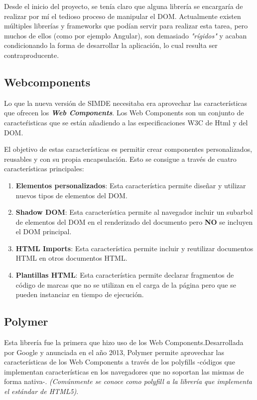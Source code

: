 Desde el inicio del proyecto, se tenía claro que alguna librería se encargaría de realizar 
por mí el tedioso proceso de manipular el DOM. Actualmente existen múltiples librerías 
y frameworks que podían servir para realizar esta tarea, pero muchos de ellos (como por ejemplo Angular),
son demasiado \textit{"rígidos"} y acaban condicionando la forma de desarrollar la aplicación, 
lo cual resulta ser contraproducente.

\subsection{Webcomponents}

\bigskip
Lo que la nueva versión de SIMDE necesitaba era aprovechar las características que ofrecen los
\textit\textbf{Web Components}. Los Web Components son un conjunto de caracteŕisticas que se 
están añadiendo a las especificaciones W3C de Html y del DOM.

\bigskip 
El objetivo de estas características es permitir crear componentes personalizados, reusables y 
con su propia encapsulación. Esto se consigue a través de cuatro características principales:

\begin{enumerate}

\item \textbf{Elementos personalizados}: Esta característica permite diseñar y utilizar nuevos tipos 
de elementos del DOM.
\item \textbf{Shadow DOM}: Esta característica permite al navegador incluir un subarbol de elementos del 
DOM en el renderizado del documento pero \textbf{NO} se incluyen el DOM principal.
\item \textbf{HTML Imports}: Esta característica permite incluir y reutilizar documentos HTML en otros 
documentos HTML.
\item \textbf{Plantillas HTML}: Esta característica permite declarar fragmentos de código de marcas que no
se utilizan en el carga de la página pero que se pueden instanciar en tiempo de ejecución. 

\end{enumerate}

\subsection{Polymer}
Esta librería fue la primera que hizo uso de los Web Components.Desarrollada por Google y anunciada en 
el año 2013, Polymer permite aprovechar las características de los Web Components a través de los polyfills 
-códigos que implementan características en los navegadores que no soportan las mismas de forma nativa-.
\textit{(Comúnmente se conoce como polyfill a la librería que implementa el estándar de HTML5)}.

